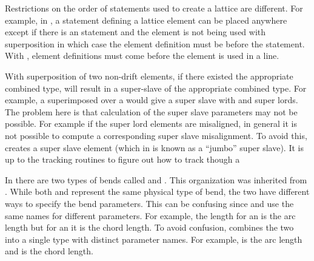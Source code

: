 \begin{description}
%
\item
Restrictions on the order of statements used to create a lattice are different. 
For example, in \bmad, a statement defining a lattice element can be placed anywhere
except if there is an  statement and the element is not being used
with superposition in which case the element definition must be before the 
statement. With \accellat, element definitions must come before the element is used in a line.
%
\item
With \bmad superposition of two non-drift elements, if there existed the appropriate
combined type, will result in a super-slave of the appropriate combined type. For example,
a  superimposed over a  would give a  super slave with
 and  super lords. The problem here is that calculation of the
super slave parameters may not be possible. For example if the super lord
elements are misaligned, in general it is not possible to compute a corresponding super slave
misalignment. To avoid this, \accellat creates a  super slave element
(which in \bmad is known as a ``jumbo'' super slave). It is up to the tracking routines to
figure out how to track though a 
%
\item
In  there are two types of bends called  and . 
This organization was inherited from . While both  and 
represent the same physical type of bend, the two have different ways to specify the bend parameters. 
This can be confusing since  and  use the same names for different parameters.
For example, the length  for an  is the arc length but for an  it is the
chord length. To avoid confusion, \accellat combines the two into a single  type with
distinct parameter names. For example,  is the arc length and  is the chord length.
\end{description}




